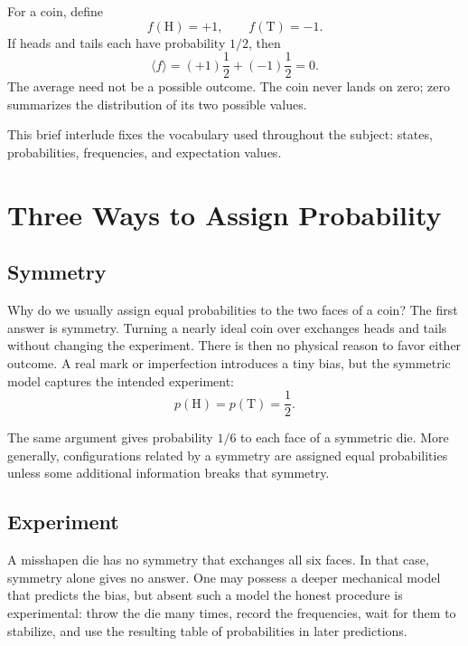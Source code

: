 For a coin, define
\begin{equation}
 f(\mathrm{H})=+1,
 \qquad
 f(\mathrm{T})=-1.
\end{equation}
If heads and tails each have probability \(1/2\), then
\begin{equation}
 \langle f\rangle
 =(+1)\frac12+(-1)\frac12=0.
\end{equation}
The average need not be a possible outcome. The coin never lands on zero;
zero summarizes the distribution of its two possible values.

This brief interlude fixes the vocabulary used throughout the subject:
states, probabilities, frequencies, and expectation values.

\section{Three Ways to Assign Probability}

\subsection{Symmetry}

Why do we usually assign equal probabilities to the two faces of a coin?
The first answer is symmetry. Turning a nearly ideal coin over exchanges
heads and tails without changing the experiment. There is then no physical
reason to favor either outcome. A real mark or imperfection introduces a tiny
bias, but the symmetric model captures the intended experiment:
\begin{equation}
 p(\mathrm{H})=p(\mathrm{T})=\frac12.
\end{equation}

The same argument gives probability \(1/6\) to each face of a symmetric die.
More generally, configurations related by a symmetry are assigned equal
probabilities unless some additional information breaks that symmetry.

\subsection{Experiment}

A misshapen die has no symmetry that exchanges all six faces. In that case,
symmetry alone gives no answer. One may possess a deeper mechanical model
that predicts the bias, but absent such a model the honest procedure is
experimental: throw the die many times, record the frequencies, wait for
them to stabilize, and use the resulting table of probabilities in later
predictions.

